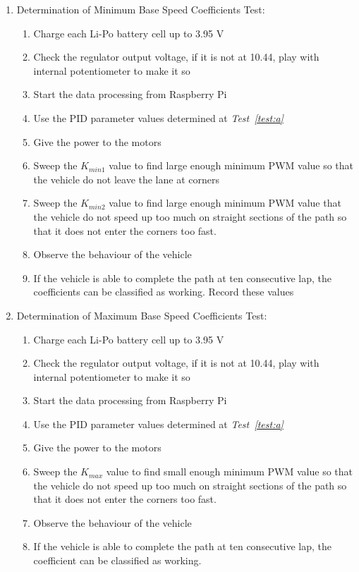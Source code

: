 \documentclass[a4paper,12pt]{article}
\begin{document}
\begin{enumerate}
	
	
	\item Determination of Minimum Base Speed Coefficients Test: \label{test:a2}		
	\begin{enumerate}
		\item Charge each Li-Po battery cell  up to 3.95 V
		\item Check the regulator output voltage, if it is not at 10.44, play with internal potentiometer to make it so  
		\item Start the data processing from Raspberry Pi
		\item Use the PID parameter values determined at \textit{Test~\ref{test:a}}
		\item Give the power to the motors  
		\item Sweep the $K_{min1}$ value to find large enough minimum PWM value so that the vehicle do not leave the lane at corners
		\item Sweep the $K_{min2}$ value to find large enough minimum PWM value that the vehicle do not speed up too much on straight sections of the path so that it does not enter the corners too fast.
		\item Observe the behaviour of the vehicle  
		\item If the vehicle is able to complete the path at ten consecutive lap, the coefficients can be classified as working. Record these values  
	\end{enumerate}
	
	\item Determination of Maximum Base Speed Coefficients Test: \label{test:a2}		
	\begin{enumerate}
		\item Charge each Li-Po battery cell  up to 3.95 V
		\item Check the regulator output voltage, if it is not at 10.44, play with internal potentiometer to make it so  
		\item Start the data processing from Raspberry Pi
		\item Use the PID parameter values determined at \textit{Test~\ref{test:a}}
		\item Give the power to the motors  
		\item Sweep the $K_{max}$ value to find small enough minimum PWM value so that the vehicle do not speed up too much on straight sections of the path so that it does not enter the corners too fast.
		\item Observe the behaviour of the vehicle  
		\item If the vehicle is able to complete the path at ten consecutive lap, the coefficient can be classified as working.  
	\end{enumerate}
	

\end{enumerate}
\end{document}
